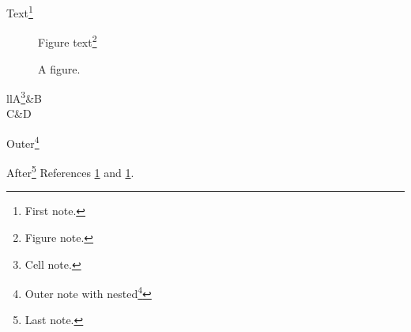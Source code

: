 \documentclass{article}
\begin{document}
Text\footnote{First note.\label{note:first}}
\begin{figure}Figure text\footnote{Figure note.}\caption{A figure.}\label{fig:a}\end{figure}
\begin{savedtable}{ll}A\footnote{Cell note.}&B\\ C&D\end{savedtable}
\begin{savenotes}Outer\footnote{Outer note with nested\footnote{Nested note.}}\end{savenotes}
After\footnote{Last note.} References \ref{note:first} and \ref{fig:a}.
\end{document}
